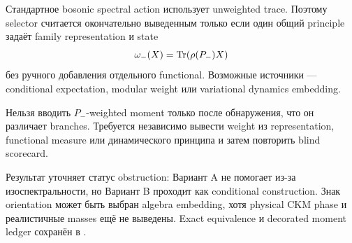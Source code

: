 Стандартное bosonic spectral action использует unweighted trace. Поэтому
selector считается окончательно выведенным только если один общий principle
задаёт family representation и state
\begin{equation}
 \omega_-(X)=\operatorname{Tr}(\rho(P_-)X)
\end{equation}
без ручного добавления отдельного functional. Возможные источники ---
conditional expectation, modular weight или variational dynamics embedding.

\begin{nogocriterion}
Нельзя вводить \(P_-\)-weighted moment только после обнаружения, что он
различает branches. Требуется независимо вывести weight из representation,
functional measure или динамического принципа и затем повторить blind
scorecard.
\end{nogocriterion}

Результат уточняет статус obstruction: Вариант A не помогает из-за
изоспектральности, но Вариант B проходит как conditional construction.
Знак orientation может быть выбран algebra embedding, хотя physical CKM
phase и реалистичные masses ещё не выведены. Exact equivalence и decorated
moment ledger сохранён в
.